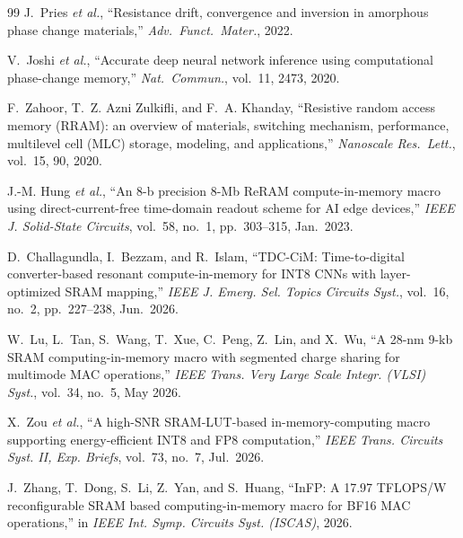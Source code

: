 \documentclass[conference]{IEEEtran}
\begin{document}
\begin{thebibliography}{99}
J.~Pries \emph{et al.}, ``Resistance drift, convergence and inversion in
amorphous phase change materials,'' \emph{Adv.\ Funct.\ Mater.}, 2022.

V.~Joshi \emph{et al.}, ``Accurate deep neural network inference using
computational phase-change memory,'' \emph{Nat.\ Commun.}, vol.~11, 2473,
2020.

F.~Zahoor, T.~Z. Azni Zulkifli, and F.~A. Khanday, ``Resistive random access
memory (RRAM): an overview of materials, switching mechanism, performance,
multilevel cell (MLC) storage, modeling, and applications,'' \emph{Nanoscale
Res.\ Lett.}, vol.~15, 90, 2020.

J.-M. Hung \emph{et al.}, ``An 8-b precision 8-Mb ReRAM compute-in-memory macro
using direct-current-free time-domain readout scheme for AI edge devices,''
\emph{IEEE J. Solid-State Circuits}, vol.~58, no.~1, pp.\ 303--315, Jan.\ 2023.

D.~Challagundla, I.~Bezzam, and R.~Islam, ``TDC-CiM: Time-to-digital
converter-based resonant compute-in-memory for INT8 CNNs with layer-optimized
SRAM mapping,'' \emph{IEEE J. Emerg. Sel. Topics Circuits Syst.}, vol.~16,
no.~2, pp.\ 227--238, Jun.\ 2026.

W.~Lu, L.~Tan, S.~Wang, T.~Xue, C.~Peng, Z.~Lin, and X.~Wu, ``A 28-nm 9-kb
SRAM computing-in-memory macro with segmented charge sharing for multimode MAC
operations,'' \emph{IEEE Trans. Very Large Scale Integr. (VLSI) Syst.},
vol.~34, no.~5, May 2026.

X.~Zou \emph{et al.}, ``A high-SNR SRAM-LUT-based in-memory-computing macro
supporting energy-efficient INT8 and FP8 computation,'' \emph{IEEE Trans.
Circuits Syst. II, Exp. Briefs}, vol.~73, no.~7, Jul.\ 2026.

J.~Zhang, T.~Dong, S.~Li, Z.~Yan, and S.~Huang, ``InFP: A 17.97 TFLOPS/W
reconfigurable SRAM based computing-in-memory macro for BF16 MAC operations,''
in \emph{IEEE Int. Symp. Circuits Syst. (ISCAS)}, 2026.
\end{thebibliography}
\end{document}
